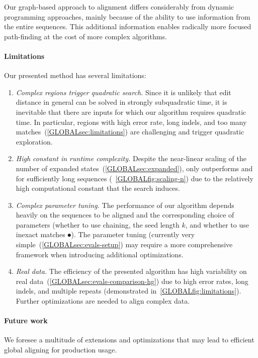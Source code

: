 Our graph-based approach to alignment differs considerably from dynamic
programming approaches, mainly because of the ability to use information from the
entire sequences. This additional information enables radically more focused
path-finding at the cost of more complex algorithms.

\paragraph{Limitations}
Our presented method has several limitations:
\begin{enumerate}
  \item \emph{Complex regions trigger quadratic search.} Since it is unlikely
        that edit distance in general can be solved in strongly subquadratic
        time, it is inevitable that there are inputs for which our algorithm
        requires quadratic time.  In particular, regions with high error rate,
        long indels, and too many matches~(\cref{GLOBALsec:limitations}) are
        challenging and trigger quadratic exploration.
  \item \emph{High constant in runtime complexity.} Despite the near-linear
        scaling of the number of expanded states~(\cref{GLOBALsec:expanded}),
        \astarpa only outperforms \edlib and \wfa for sufficiently long sequences
        (~\cref{GLOBALfig:scaling-n}) due to the relatively high computational constant
        that the \A search induces.
  \item \emph{Complex parameter tuning.} The performance of our algorithm
        depends heavily on the sequences to be aligned and the corresponding choice of
        parameters (whether to use chaining, the seed length $k$, and whether to use
        inexact matches $\spot$). The parameter tuning (currently
        very simple~(\cref{GLOBALsec:evals-setup}) may require a more comprehensive
        framework when introducing additional optimizations.
  \item \emph{Real data.} The efficiency of the presented algorithm has high
        variability on real data~(\cref{GLOBALsec:evals-comparison-hg}) due to high
        error rates, long indels, and multiple repeats (demonstrated
        in~\cref{GLOBALfig:limitations}). Further optimizations are needed to align
        complex data.
\end{enumerate}

\paragraph{Future work}
We foresee a multitude of extensions and optimizations that may lead to
efficient global aligning for production usage.

